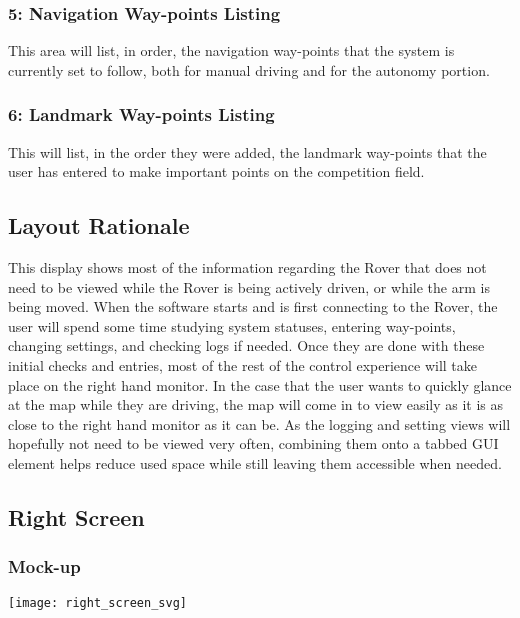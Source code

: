 \subsubsection{5: Navigation Way-points Listing}
This area will list, in order, the navigation way-points that the system is currently set to follow, both for manual driving and for the autonomy portion.

\subsubsection{6: Landmark Way-points Listing}
This will list, in the order they were added, the landmark way-points that the user has entered to make important points on the competition field.

\subsection{Layout Rationale}
This display shows most of the information regarding the Rover that does not need to be viewed while the Rover is being actively driven, or while the arm is being moved.
When the software starts and is first connecting to the Rover, the user will spend some time studying system statuses, entering way-points, changing settings, and checking logs if needed.
Once they are done with these initial checks and entries, most of the rest of the control experience will take place on the right hand monitor.
In the case that the user wants to quickly glance at the map while they are driving, the map will come in to view easily as it is as close to the right hand monitor as it can be.
As the logging and setting views will hopefully not need to be viewed very often, combining them onto a tabbed GUI element helps reduce used space while still leaving them accessible when needed.


\subsection{Right Screen}
\subsubsection{Mock-up}
\vspace{1em}
\begin{minipage}{\linewidth}
  \begin{center}
  \texttt{[image: right\_screen\_svg]}
  \end{center}
\end{minipage}

